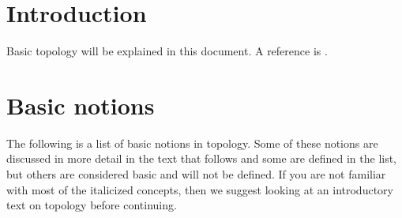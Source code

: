 \section{Introduction}
\label{topology-section-introduction}
Basic topology will be explained in this document.
A reference is \cite{Engelking}.

\section{Basic notions}
\label{topology-section-topology-basic}
The following is a list of basic notions in topology. Some of these notions
are discussed in more detail in the text that follows and some
are defined in the list, but others are considered basic and will not
be defined. If you are not familiar with most of the italicized concepts,
then we suggest looking at an introductory text on topology before
continuing.


